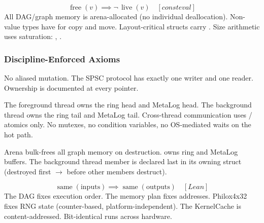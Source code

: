 \begin{definition}[MemSafe]
\label{def:memsafe}
\[
  \operatorname{free}(v) \implies \neg\,\operatorname{live}(v)
  \quad [\textit{consteval}]
\]
All DAG/graph memory is arena-allocated (no individual deallocation).
Non-value types have  for copy and move.
Layout-critical structs carry .
Size arithmetic uses saturation: , .
\end{definition}

\subsubsection{Discipline-Enforced Axioms}

\begin{definition}[BorrowSafe]
\label{def:borrowsafe}
No aliased mutation.  The SPSC protocol has exactly one writer and one
reader.  Ownership is documented at every pointer.
\end{definition}

\begin{definition}[ThreadSafe]
\label{def:threadsafe}
The foreground thread owns the ring head and MetaLog head.
The background thread owns the ring tail and MetaLog tail.
Cross-thread communication uses / atomics only.
No mutexes, no condition variables, no OS-mediated waits on the hot path.
\end{definition}

\begin{definition}[LeakSafe]
\label{def:leaksafe}
Arena bulk-frees all graph memory on destruction.
 owns ring and MetaLog buffers.
The background thread member is declared last in its owning struct
(destroyed first $\to$  before other members destruct).
\end{definition}

\begin{definition}[DetSafe]
\label{def:detsafe}
\[
  \operatorname{same}(\text{inputs}) \implies \operatorname{same}(\text{outputs})
  \quad [\textit{Lean}]
\]
The DAG fixes execution order.  The memory plan fixes addresses.
Philox4x32 fixes RNG state (counter-based, platform-independent).
The KernelCache is content-addressed.  Bit-identical runs across hardware.
\end{definition}

